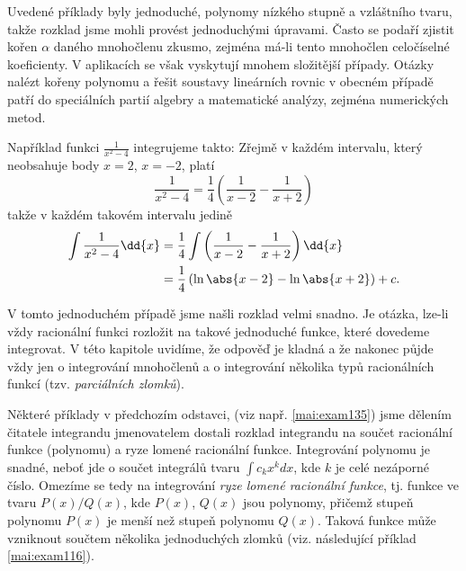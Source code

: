       Uvedené příklady byly jednoduché, polynomy nízkého stupně a vzláštního tvaru, takže rozklad
      jsme mohli provést jednoduchými úpravami. Často se podaří zjistit kořen \(\alpha\) daného
      mnohočlenu zkusmo, zejména má-li tento mnohočlen celočíselné koeficienty. V aplikacích se však
      vyskytují mnohem složitější případy. Otázky nalézt kořeny polynomu a řešit soustavy lineárních
      rovnic v obecném případě patří do speciálních partií algebry a matematické analýzy, zejména
      numerických metod.
      
      Například funkci \(\frac{1}{x^2-4}\) integrujeme takto: Zřejmě v každém intervalu, který
      neobsahuje body \(x=2\), \(x=-2\), platí
      \begin{equation*}
        \dfrac{1}{x^2-4} = \dfrac{1}{4}\left(\dfrac{1}{x-2} - \dfrac{1}{x+2}\right)
      \end{equation*}
      takže v každém takovém intervalu jedině
      \begin{align*}
        \int\dfrac{1}{x^2-4}\dd{x}  
          &= \dfrac{1}{4}\int\left(\dfrac{1}{x-2} - \dfrac{1}{x+2}\right)\dd{x}             \\
          &= \dfrac{1}{4}\left(\ln\abs{x-2} - \ln\abs{x+2}\right) + c.        
      \end{align*}

      V tomto jednoduchém případě jsme našli rozklad velmi snadno. Je otázka, lze-li vždy racionální
      funkci rozložit na takové jednoduché funkce, které dovedeme integrovat. V této kapitole
      uvidíme, že odpověď je kladná a že nakonec půjde vždy jen o integrování mnohočlenů a o
      integrování několika typů racionálních funkcí (tzv. \emph{parciálních zlomků}). 
      
      
    \newpage
      Některé příklady v předchozím odstavci, (viz např. \ref{mai:exam135}) jsme dělením čitatele
      integrandu jmenovatelem dostali rozklad integrandu na součet racionální funkce (polynomu) a
      ryze lomené racionální funkce. Integrování polynomu je snadné, neboť jde o součet integrálů
      tvaru \(\int c_kx^k dx\), kde \(k\) je celé nezáporné číslo. Omezíme se tedy na integrování
      \emph{ryze lomené racionální funkce},  tj. funkce ve tvaru \(P(x)/Q(x)\), kde \(P(x)\),
      \(Q(x)\) jsou polynomy, přičemž stupeň polynomu \(P(x)\) je menší než stupeň polynomu \(Q(x)\).
      Taková funkce může vzniknout součtem několika jednoduchých zlomků (viz. následující příklad
      \ref{mai:exam116}).      
      
      
